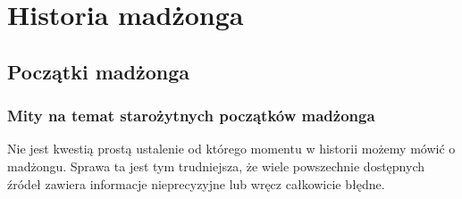 \chapter{Historia madżonga}
\label{historia}
\section{Początki madżonga}
\subsection{Mity na temat starożytnych początków madżonga}
Nie jest kwestią prostą ustalenie od którego momentu w historii możemy mówić o
madżongu. Sprawa ta jest tym trudniejsza, że wiele powszechnie dostępnych źródeł
zawiera informacje nieprecyzyjne lub wręcz całkowicie błędne. 

